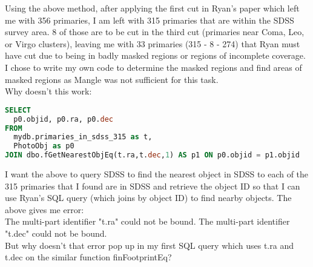 \documentclass[10pt,letterpaper]{article}
\begin{document}
Using the above method, after applying the first cut in Ryan's paper which left me with 356 primaries, I am left with 315 primaries that are within the SDSS survey area. 8 of those are to be cut in the third cut (primaries near Coma, Leo, or Virgo clusters), leaving me with 33 primaries (315 - 8 - 274) that Ryan must have cut due to being in badly masked regions or regions of incomplete coverage.\\

I chose to write my own code to determine the masked regions and find areas of masked regions as Mangle \cite{mangle} was not sufficient for this task.\\

Why doesn't this work:\\

\begin{lstlisting}[language=SQL]
SELECT 
  p0.objid, p0.ra, p0.dec
FROM 
  mydb.primaries_in_sdss_315 as t, 
  PhotoObj as p0
JOIN dbo.fGetNearestObjEq(t.ra,t.dec,1) AS p1 ON p0.objid = p1.objid
\end{lstlisting}

I want the above to query SDSS to find the nearest object in SDSS to each of the 315 primaries that I found are in SDSS and retrieve the object ID so that I can use Ryan's SQL query (which joins by object ID) to find nearby objects. The above gives me error: \\

The multi-part identifier "t.ra" could not be bound. The multi-part identifier "t.dec" could not be bound.\\

But why doesn't that error pop up in my first SQL query which uses t.ra and t.dec on the similar function finFootprintEq?
\end{document}
